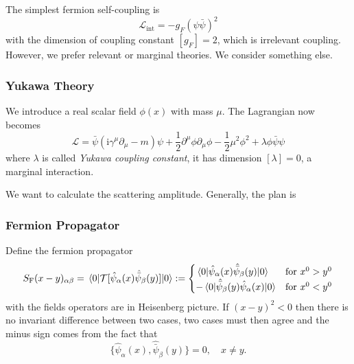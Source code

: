 \documentclass[a4paper,11pt]{article}
\begin{document}
	The simplest fermion self-coupling is 
	\[
		\mathcal{L} _{\text{int}} = - g_F \left( \psi \bar \psi \right)^2
	\]
	with the dimension of coupling constant $[g_F] = 2$, which is irrelevant coupling. However, we prefer relevant or marginal theories. We consider something else.

	\subsubsection{Yukawa Theory}
	We introduce a real scalar field $\phi(x)$ with mass $\mu$. The Lagrangian now becomes 
	\[
		\mathcal{L} = \bar \psi (\mathrm{i} \gamma^\mu \partial_\mu - m) \psi + \frac{1}{2} \partial^\mu \phi \partial_\mu \phi - \frac{1}{2} \mu^2 \phi^2 + \lambda \phi \bar \psi \psi
	\]
	where $\lambda$ is called \emph{Yukawa coupling constant}, it has dimension $[\lambda] = 0$, a marginal interaction. 

	We want to calculate the scattering amplitude. Generally, the plan is 
	\begin{center}
	\end{center}
	
	\subsubsection{Fermion Propagator}
	Define the fermion propagator 
	\[
		S _{\text{F}}(x - y) _{\alpha \beta} = \mel{0}{\mathcal{T}[\hat \psi_\alpha(x)\hat{\bar \psi}_\beta(y)]}{0} := \begin{cases}
			\mel{0}{\hat \psi_\alpha(x)\hat{\bar \psi}_\beta(y)}{0} & \text{for } x^0 > y^0\\
			- \mel{0}{\hat{\bar \psi}_\beta(y)\hat \psi_\alpha(x)}{0} & \text{for } x^0 < y^0
		\end{cases}
	\]
	with the fields operators are in Heisenberg picture. If $(x - y)^2 < 0$ then there is no invariant difference between two cases, two cases must then agree and the minus sign comes from the fact that 
	\[
		\{\hat \psi_\alpha(x), \hat{\bar \psi}_\beta(y)\} = 0, \quad x \neq y.
	\]
	
\end{document}
